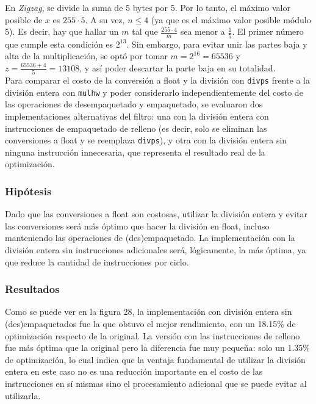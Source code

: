 \documentclass[a4paper]{article}
\begin{document}
En \textit{Zigzag}, se divide la suma de 5 bytes por 5. Por lo tanto, el máximo valor posible de $x$ es $255\cdot 5$. A su vez, $n \leq 4$ (ya que es el máximo valor posible módulo 5). Es decir, hay que hallar un $m$ tal que $\frac{255\cdot4}{m}$ sea menor a $\frac{1}{5}$. El primer número que cumple esta condición es $2^{13}$. Sin embargo, para evitar unir las partes baja y alta de la multiplicación, se optó por tomar $m = 2^{16} = 65536$ y $z = \frac{65536 + 4}{5} = 13108$, y así poder descartar la parte baja en su totalidad. \\

Para comparar el costo de la conversión a float y la división con {\tt divps} frente a la división entera con {\tt mulhw} y poder considerarlo independientemente del costo de las operaciones de desempaquetado y empaquetado, se evaluaron dos implementaciones alternativas del filtro: una con la división entera con instrucciones de empaquetado de relleno (es decir, solo se eliminan las conversiones a float y se reemplaza {\tt divps}), y otra con la división entera sin ninguna instrucción innecesaria, que representa el resultado real de la optimización.

\subsubsection{Hipótesis}
Dado que las conversiones a float son costosas, utilizar la división entera y evitar las conversiones será más óptimo que hacer la división en float, incluso manteniendo las operaciones de (des)empaquetado. La implementación con la división entera sin instrucciones adicionales será, lógicamente, la más óptima, ya que reduce la cantidad de instrucciones por ciclo.

\subsubsection{Resultados}
Como se puede ver en la figura 28, la implementación con división entera sin (des)empaquetados fue la que obtuvo el mejor rendimiento, con un 18.15\% de optimización respecto de la original. La versión con las instrucciones de relleno fue más óptima que la original pero la diferencia fue muy pequeña: solo un 1.35\% de optimización, lo cual indica que la ventaja fundamental de utilizar la división entera en este caso no es una reducción importante en el costo de las instrucciones en sí mismas sino el procesamiento adicional que se puede evitar al utilizarla.
\end{document}
